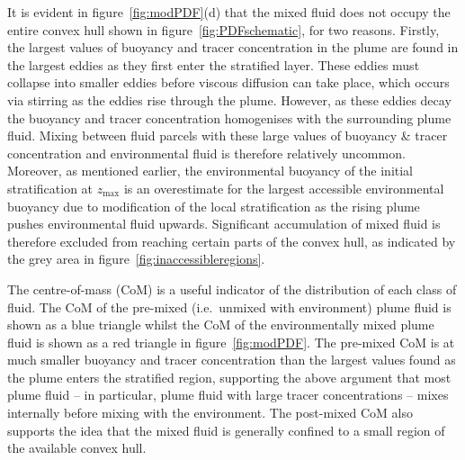 \documentclass[a4paper]{article}
\begin{document}
It is evident in figure~\ref{fig:modPDF}(d) that the mixed fluid does not occupy the entire convex hull 
shown in figure~\ref{fig:PDFschematic}, for two reasons. Firstly, the largest values of buoyancy and
tracer concentration in the plume are found in the largest eddies as they first enter the stratified layer.
These eddies must collapse into smaller eddies before viscous diffusion can take place, which occurs via
stirring as the eddies rise through the plume. However, as these eddies decay the buoyancy and tracer
concentration homogenises with the surrounding plume fluid. Mixing between fluid parcels with these large
values of buoyancy \& tracer concentration and environmental fluid is therefore relatively uncommon. Moreover,
as mentioned earlier, the environmental buoyancy of the initial stratification at $z_{\max}$ is an
overestimate for the largest accessible environmental buoyancy due to modification of the local
stratification as the rising plume pushes environmental fluid upwards. Significant accumulation of mixed fluid
is therefore excluded from reaching certain parts of the convex hull, as indicated by the grey area in
figure~\ref{fig:inaccessibleregions}. 

The centre-of-mass (CoM) is a useful indicator of the distribution of each class of fluid. The CoM of the
pre-mixed (i.e.\ unmixed with environment) plume fluid is shown as a blue triangle whilst the CoM of the
environmentally mixed plume fluid is shown as a red triangle in figure~\ref{fig:modPDF}. The pre-mixed CoM is
at much smaller buoyancy and tracer concentration than the largest values found as the plume enters the
stratified region, supporting the above argument that most plume fluid -- in particular, plume fluid with
large tracer concentrations -- mixes internally before mixing with the environment. The post-mixed CoM also
supports the idea that the mixed fluid is generally confined to a small region of the available convex hull.
\end{document}
